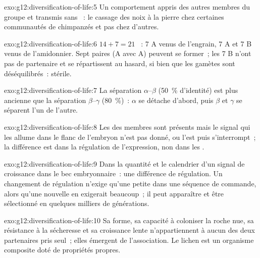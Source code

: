 \begin{solution}{exo:g12:diversification-of-life:5}
Un comportement appris des autres membres du groupe et transmis sans
~: le cassage des noix à la pierre chez certaines communautés de
chimpanzés et pas chez d'autres.
\end{solution}

\begin{solution}{exo:g12:diversification-of-life:6}
$14 + 7 = 21$ ~: 7 A venus de l'engrain, 7 A et 7 B venus de
l'amidonnier. Sept paires (A avec A) peuvent se former~; les 7
 B n'ont pas de partenaire et se répartissent au hasard, si
bien que les gamètes sont déséquilibrés~: stérile.
\end{solution}

\begin{solution}{exo:g12:diversification-of-life:7}
La séparation $\alpha$--$\beta$ (50~\% d'identité) est plus ancienne
que la séparation $\beta$--$\gamma$ (80~\%)~: $\alpha$ se détache
d'abord, puis $\beta$ et $\gamma$ se séparent l'un de l'autre.
\end{solution}

\begin{solution}{exo:g12:diversification-of-life:8}
Les  des membres sont présents mais le signal qui les allume dans
le flanc de l'embryon n'est pas donné, ou l'est puis s'interrompt~; la
différence est dans la régulation de l'expression, non dans les .
\end{solution}

\begin{solution}{exo:g12:diversification-of-life:9}
Dans la quantité et le calendrier d'un signal de croissance dans le bec
embryonnaire~: une différence de régulation. Un changement de
régulation n'exige qu'une petite  dans une séquence de
commande, alors qu'une  nouvelle en exigerait beaucoup~; il peut
apparaître et être sélectionné en quelques milliers de générations.
\end{solution}

\begin{solution}{exo:g12:diversification-of-life:10}
Sa forme, sa capacité à coloniser la roche nue, sa résistance à la
sécheresse et sa croissance lente n'appartiennent à aucun des deux
partenaires pris seul~; elles émergent de l'association. Le lichen est
un organisme composite doté de propriétés propres.
\end{solution}

